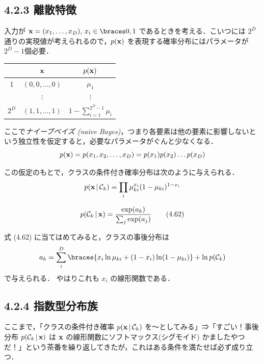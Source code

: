 \newpage
\subsection*{4.2.3 離散特徴}

入力が $\vx = (x_1, \dots, x_D),\, x_i \in \set{0,1}$ であるときを考える．こいつには $2^D$ 通りの実現値が考えられるので，$p({\mathbf{x}})$ を表現する確率分布にはパラメータが $2^D - 1$個必要．

\begin{table}[h]
\centering
\begin{tabular}{c|c|c}\hline
      & ${\mathbf{x}}$           & $p({\mathbf{x}})$                      \\ \hline \hline
1     & $(0,0,\dots,0)$ & $\mu_1$                    \\ \hline
      & $\vdots$        &  $\vdots$              \\ \hline
$2^D$ & $(1,1,\dots,1)$ & ${\displaystyle 1-\sum_{i=1}^{2^D - 1} \mu_i}$ \\ \hline
\end{tabular}
\end{table}
  
ここで\emph{ナイーブベイズ (naive Bayes)}，つまり各要素は他の要素に影響しないという独立性を仮定すると，必要なパラメータがぐんと少なくなる．
\[
  p({\mathbf{x}}) = p(x_1, x_2, \dots, x_D) = p(x_1) p(x_2) \dots p(x_D)
\]

この仮定のもとで，クラスの条件付き確率分布は次のように与えられる．
\begin{equation}
  p({\mathbf{x}} \,|\, {\mathcal{C}}_k) = \prod_i \mu_{ki}^{x_i} (1 - \mu_{ki})^{1-x_i}
\end{equation}

\begin{embedbox}
 \[
  p({\mathcal{C}}_k \,|\, {\mathbf{x}}) = \frac{\exp(a_k)}{\sum_j \exp(a_j)} \tag{4.62}
  \]
\end{embedbox}

式 (4.62) に当てはめてみると，クラスの事後分布は
\begin{equation}
  a_k = \sum_i^D \braces{ x_i \ln \mu_{ki} + (1 - x_i) \ln (1 - \mu_{ki})} + \ln p(\cC_k)
\end{equation}
で与えられる．
やはりこれも $x_i$ の線形関数である．

\subsection*{4.2.4 指数型分布族}

ここまで，「クラスの条件付き確率 $p({\mathbf{x}} \,|\, {\mathcal{C}}_k)$ を〜としてみる」⇒「すごい！事後分布 $p({\mathcal{C}}_k \,|\, {\mathbf{x}})$ は ${\mathbf{x}}$ の線形関数にソフトマックス(シグモイド) かましたやつだ！」という茶番を繰り返してきたが，これはある条件を満たせば必ず成り立つ．

